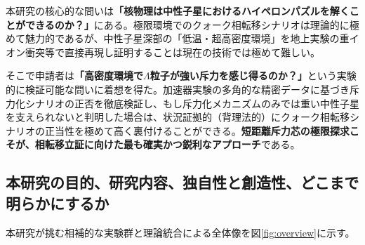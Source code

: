 \documentclass[11pt,a4j,dvipdfmx]{jarticle} 					%
\newcommand{\研究課題名}{加速器実験による短距離バリオン間相互作用の解明と中性子星ハイペロンパズルの解決}
\newcommand{\研究機関名}{東北大学}
\newcommand{\研究代表者氏名}{市川裕大}
\newcommand{\研究期間の最終元号年度}{13}
\begin{document}
本研究の核心的な問いは\textbf{「核物理は中性子星におけるハイペロンパズルを解くことができるのか？」}にある。極限環境でのクォーク相転移シナリオは理論的に極めて魅力的であるが、中性子星深部の「低温・超高密度環境」を地上実験の重イオン衝突等で直接再現し証明することは現在の技術では極めて難しい。

そこで申請者は\textbf{「高密度環境で$\Lambda$粒子が強い斥力を感じ得るのか？」}という実験的に検証可能な問いに着想を得た。加速器実験の多角的な精密データに基づき斥力化シナリオの正否を徹底検証し、もし斥力化メカニズムのみでは重い中性子星を支えられないと判明した場合は、状況証拠的（背理法的）にクォーク相転移シナリオの正当性を極めて高く裏付けることができる。\textbf{短距離斥力芯の極限探求こそが、相転移立証に向けた最も確実かつ鋭利なアプローチ}である。

\subsection{本研究の目的、研究内容、独自性と創造性、どこまで明らかにするか}

本研究が挑む相補的な実験群と理論統合による全体像を図\ref{fig:overview}に示す。
\end{document}
